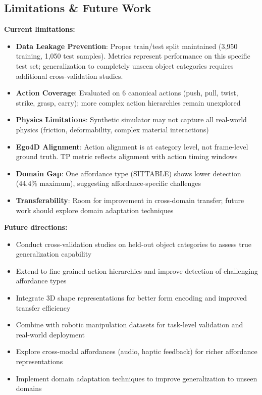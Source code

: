 \documentclass[11pt]{article}
\begin{document}
\subsection{Limitations \& Future Work}

\textbf{Current limitations:}
\begin{itemize}
    \item \textbf{Data Leakage Prevention}: Proper train/test split maintained (3,950 training, 1,050 test samples). Metrics represent performance on this specific test set; generalization to completely unseen object categories requires additional cross-validation studies.
    \item \textbf{Action Coverage}: Evaluated on 6 canonical actions (push, pull, twist, strike, grasp, carry); more complex action hierarchies remain unexplored
    \item \textbf{Physics Limitations}: Synthetic simulator may not capture all real-world physics (friction, deformability, complex material interactions)
    \item \textbf{Ego4D Alignment}: Action alignment is at category level, not frame-level ground truth. TP metric reflects alignment with action timing windows
    \item \textbf{Domain Gap}: One affordance type (SITTABLE) shows lower detection (44.4\% maximum), suggesting affordance-specific challenges
    \item \textbf{Transferability}: Room for improvement in cross-domain transfer; future work should explore domain adaptation techniques
\end{itemize}

\textbf{Future directions:}
\begin{itemize}
    \item Conduct cross-validation studies on held-out object categories to assess true generalization capability
    \item Extend to fine-grained action hierarchies and improve detection of challenging affordance types
    \item Integrate 3D shape representations for better form encoding and improved transfer efficiency
    \item Combine with robotic manipulation datasets for task-level validation and real-world deployment
    \item Explore cross-modal affordances (audio, haptic feedback) for richer affordance representations
    \item Implement domain adaptation techniques to improve generalization to unseen domains
\end{itemize}
\end{document}
